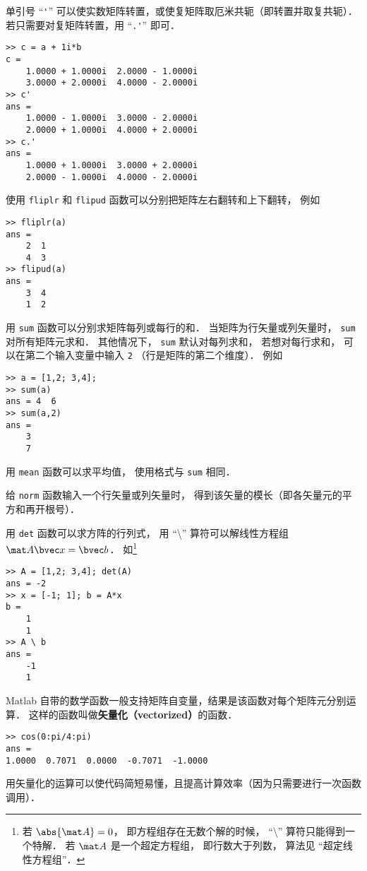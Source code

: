 单引号 “\lstinline|'|” 可以使实数矩阵转置，或使复矩阵取厄米共轭（即转置并取复共轭）．若只需要对复矩阵转置，用 “\lstinline|.'|” 即可．
\begin{lstlisting}[language=MatlabCom]
>> c = a + 1i*b
c =
    1.0000 + 1.0000i  2.0000 - 1.0000i
    3.0000 + 2.0000i  4.0000 - 2.0000i
>> c'
ans =
    1.0000 - 1.0000i  3.0000 - 2.0000i
    2.0000 + 1.0000i  4.0000 + 2.0000i
>> c.'
ans =
    1.0000 + 1.0000i  3.0000 + 2.0000i
    2.0000 - 1.0000i  4.0000 - 2.0000i
\end{lstlisting}
使用 \lstinline|fliplr| 和 \lstinline|flipud| 函数可以分别把矩阵左右翻转和上下翻转， 例如
\begin{lstlisting}[language=MatlabCom]
>> fliplr(a)
ans =
    2  1
    4  3
>> flipud(a)
ans =
    3  4
    1  2
\end{lstlisting}

用 \lstinline|sum| 函数可以分别求矩阵每列或每行的和． 当矩阵为行矢量或列矢量时， \lstinline|sum| 对所有矩阵元求和． 其他情况下， \lstinline|sum| 默认对每列求和， 若想对每行求和， 可以在第二个输入变量中输入 \lstinline|2| （行是矩阵的第二个维度）． 例如
\begin{lstlisting}[language=MatlabCom]
>> a = [1,2; 3,4];
>> sum(a)
ans = 4  6
>> sum(a,2)
ans =
    3
    7
\end{lstlisting}
用 \lstinline|mean| 函数可以求平均值， 使用格式与 \lstinline|sum| 相同．

给 \lstinline|norm| 函数输入一个行矢量或列矢量时， 得到该矢量的模长（即各矢量元的平方和再开根号）． 

用 \lstinline|det| 函数可以求方阵的行列式， 用 “\textbackslash” 算符可以解线性方程组%
 $\mat A \bvec x = \bvec b$． 如\footnote{若 $\abs{\mat A} = 0$， 即方程组存在无数个解的时候， “\textbackslash” 算符只能得到一个特解． 若 $\mat A$ 是一个超定方程组， 即行数大于列数， 算法见 “超定线性方程组”．}
\begin{lstlisting}[language=MatlabCom]
>> A = [1,2; 3,4]; det(A)
ans = -2
>> x = [-1; 1]; b = A*x
b =
    1
    1
>> A \ b
ans =
    -1
    1
\end{lstlisting}

Matlab 自带的数学函数一般支持矩阵自变量，结果是该函数对每个矩阵元分别运算． 这样的函数叫做\textbf{矢量化（vectorized）}的函数．
\begin{lstlisting}[language=MatlabCom]
>> cos(0:pi/4:pi)
ans =
1.0000  0.7071  0.0000  -0.7071  -1.0000
\end{lstlisting}
用矢量化的运算可以使代码简短易懂，且提高计算效率（因为只需要进行一次函数调用）．


